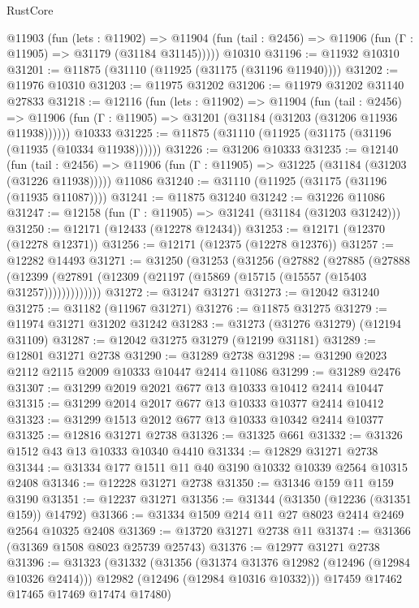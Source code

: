 \begin{lexlean}{RustCore}
\begin{coremodule}
    @11903
      (fun (lets : @11902) =>
      @11904 (fun (tail : @2456) => @11906 (fun (Γ : @11905) => @31179 (@31184 @31145)))))
    @10310
@31196 := @11932 @10310
@31201 := @11875 (@31110 (@11925 (@31175 (@31196 @11940))))
@31202 := @11976 @10310
@31203 := @11975 @31202
@31206 := @11979 @31202 @31140 @27833
@31218 := @12116
    (fun (lets : @11902) =>
    @11904
      (fun (tail : @2456) =>
      @11906 (fun (Γ : @11905) => @31201 (@31184 (@31203 (@31206 @11936 @11938))))))
    @10333
@31225 := @11875 (@31110 (@11925 (@31175 (@31196 (@11935 (@10334 @11938))))))
@31226 := @31206 @10333
@31235 := @12140
    (fun (tail : @2456) => @11906 (fun (Γ : @11905) => @31225 (@31184 (@31203 (@31226 @11938)))))
    @11086
@31240 := @31110 (@11925 (@31175 (@31196 (@11935 @11087))))
@31241 := @11875 @31240
@31242 := @31226 @11086
@31247 := @12158 (fun (Γ : @11905) => @31241 (@31184 (@31203 @31242)))
@31250 := @12171 (@12433 (@12278 @12434))
@31253 := @12171 (@12370 (@12278 @12371))
@31256 := @12171 (@12375 (@12278 @12376))
@31257 := @12282 @14493
@31271 := @31250
    (@31253
      (@31256
        (@27882
          (@27885
            (@27888
              (@12399 (@27891 (@12309 (@21197 (@15869 (@15715 (@15557 (@15403 @31257)))))))))))))
@31272 := @31247 @31271
@31273 := @12042 @31240
@31275 := @31182 (@11967 @31271)
@31276 := @11875 @31275
@31279 := @11974 @31271 @31202 @31242
@31283 := @31273 (@31276 @31279) (@12194 @31109)
@31287 := @12042 @31275 @31279 (@12199 @31181)
@31289 := @12801 @31271 @2738
@31290 := @31289 @2738
@31298 := @31290 @2023 @2112 @2115 @2009 @10333 @10447 @2414 @11086
@31299 := @31289 @2476
@31307 := @31299 @2019 @2021 @677 @13 @10333 @10412 @2414 @10447
@31315 := @31299 @2014 @2017 @677 @13 @10333 @10377 @2414 @10412
@31323 := @31299 @1513 @2012 @677 @13 @10333 @10342 @2414 @10377
@31325 := @12816 @31271 @2738
@31326 := @31325 @661
@31332 := @31326 @1512 @43 @13 @10333 @10340 @4410
@31334 := @12829 @31271 @2738
@31344 := @31334 @177 @1511 @11 @40 @3190 @10332 @10339 @2564 @10315 @2408
@31346 := @12228 @31271 @2738
@31350 := @31346 @159 @11 @159 @3190
@31351 := @12237 @31271
@31356 := @31344 (@31350 (@12236 (@31351 @159)) @14792)
@31366 := @31334 @1509 @214 @11 @27 @8023 @2414 @2469 @2564 @10325 @2408
@31369 := @13720 @31271 @2738 @11
@31374 := @31366 (@31369 @1508 @8023 @25739 @25743)
@31376 := @12977 @31271 @2738
@31396 := @31323
    (@31332
      (@31356
        (@31374 @31376 @12982 (@12496 (@12984 @10326 @2414)))
        @12982
        (@12496 (@12984 @10316 @10332)))
      @17459
      @17462
      @17465
      @17469
      @17474
      @17480)

\end{coremodule}
\end{lexlean}
